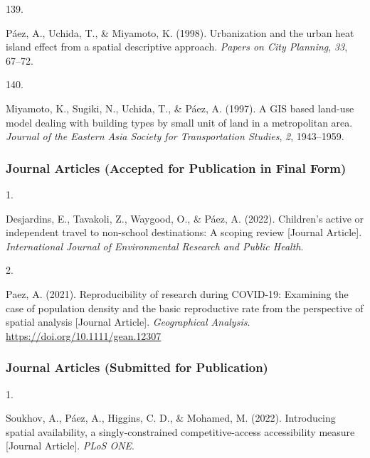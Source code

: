 \documentclass[10pt,a4paper,]{twentysecondcv}
\newlength{\csllabelwidth}
\newcommand{\CSLLeftMargin}[1]{\parbox[t]{\csllabelwidth}{#1}}
\newcommand{\CSLRightInline}[1]{\parbox[t]{\linewidth - \csllabelwidth}{#1}}
\begin{document}
\leavevmode{}%
\CSLLeftMargin{139. }%
\CSLRightInline{Páez, A., Uchida, T., \& Miyamoto, K. (1998).
Urbanization and the urban heat island effect from a spatial descriptive
approach. \emph{Papers on City Planning}, \emph{33}, 67--72.}

\leavevmode{}%
\CSLLeftMargin{140. }%
\CSLRightInline{Miyamoto, K., Sugiki, N., Uchida, T., \& Páez, A.
(1997). A GIS based land-use model dealing with building types by small
unit of land in a metropolitan area. \emph{Journal of the Eastern Asia
Society for Transportation Studies}, \emph{2}, 1943--1959.}

\hypertarget{journal-articles-accepted-for-publication-in-final-form}{%
\subsubsection{Journal Articles (Accepted for Publication in Final
Form)}\label{journal-articles-accepted-for-publication-in-final-form}}

\hypertarget{bibliography}{}
\leavevmode{}%
\CSLLeftMargin{1. }%
\CSLRightInline{Desjardins, E., Tavakoli, Z., Waygood, O., \& Páez, A.
(2022). Children's active or independent travel to non-school
destinations: A scoping review {[}Journal Article{]}.
\emph{International Journal of Environmental Research and Public
Health}.}

\leavevmode{}%
\CSLLeftMargin{2. }%
\CSLRightInline{Paez, A. (2021). Reproducibility of research during
COVID-19: Examining the case of population density and the basic
reproductive rate from the perspective of spatial analysis {[}Journal
Article{]}. \emph{Geographical Analysis}.
\url{https://doi.org/10.1111/gean.12307}}

\hypertarget{journal-articles-submitted-for-publication}{%
\subsubsection{Journal Articles (Submitted for
Publication)}\label{journal-articles-submitted-for-publication}}

\hypertarget{bibliography}{}
\leavevmode{}%
\CSLLeftMargin{1. }%
\CSLRightInline{Soukhov, A., Páez, A., Higgins, C. D., \& Mohamed, M.
(2022). Introducing spatial availability, a singly-constrained
competitive-access accessibility measure {[}Journal Article{]}.
\emph{PLoS ONE}.}
\end{document}
